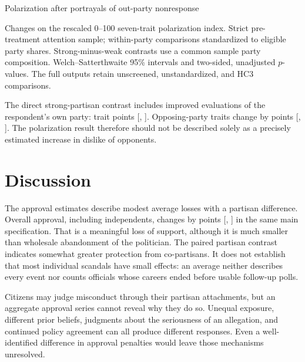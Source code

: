 \documentclass[11pt]{article}
\newcommand{\TableStyle}{\small\setlength{\tabcolsep}{5pt}\renewcommand{\arraystretch}{1.12}}
\begin{document}
\begin{table}[htbp]
\centering\TableStyle
\caption{Polarization after portrayals of out-party nonresponse}
\label{tab:experiment}
\begin{adjustbox}{max width=\textwidth}

\end{adjustbox}
\caption*{Changes on the rescaled 0--100 seven-trait polarization index. Strict pre-treatment attention sample; within-party comparisons standardized to eligible party shares. Strong-minus-weak contrasts use a common sample party composition. Welch--Satterthwaite 95\% intervals and two-sided, unadjusted $p$-values. The full outputs retain unscreened, unstandardized, and HC3 comparisons.}
\end{table}

The direct strong-partisan contrast includes improved evaluations of the respondent's own party: \ExpDirectOwnTraitsEstimate{} trait points [\ExpDirectOwnTraitsLower, \ExpDirectOwnTraitsUpper]. Opposing-party traits change by \ExpDirectOpponentTraitsEstimate{} points [\ExpDirectOpponentTraitsLower, \ExpDirectOpponentTraitsUpper]. The polarization result therefore should not be described solely as a precisely estimated increase in dislike of opponents.

\section{Discussion}

The approval estimates describe modest average losses with a partisan difference. Overall approval, including independents, changes by \OverallEstimate{} points [\OverallLower, \OverallUpper] in the same main specification. That is a meaningful loss of support, although it is much smaller than wholesale abandonment of the politician. The paired partisan contrast indicates somewhat greater protection from co-partisans. It does not establish that most individual scandals have small effects: an average neither describes every event nor counts officials whose careers ended before usable follow-up polls.

Citizens may judge misconduct through their partisan attachments, but an aggregate approval series cannot reveal why they do so. Unequal exposure, different prior beliefs, judgments about the seriousness of an allegation, and continued policy agreement can all produce different responses. Even a well-identified difference in approval penalties would leave those mechanisms unresolved.
\end{document}
